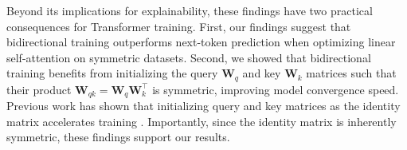 Beyond its implications for explainability, these findings have two practical consequences for Transformer training. 
%
First, 
%
our findings suggest that bidirectional training outperforms next-token prediction when optimizing linear self-attention on symmetric datasets.
%
%
Second, we showed that bidirectional training benefits from initializing the query $\bm{W}_q$ and key $\bm{W}_k$ matrices such that their product $\bm{W}_{qk} = \bm{W}_q\bm{W}^\top_k$ is symmetric, improving model convergence speed.
%
Previous work has shown that initializing query and key matrices as the identity matrix accelerates training \citep{trockman_mimetic_2023}.
%
Importantly, since the identity matrix is inherently symmetric, these findings support our results.
%
%
